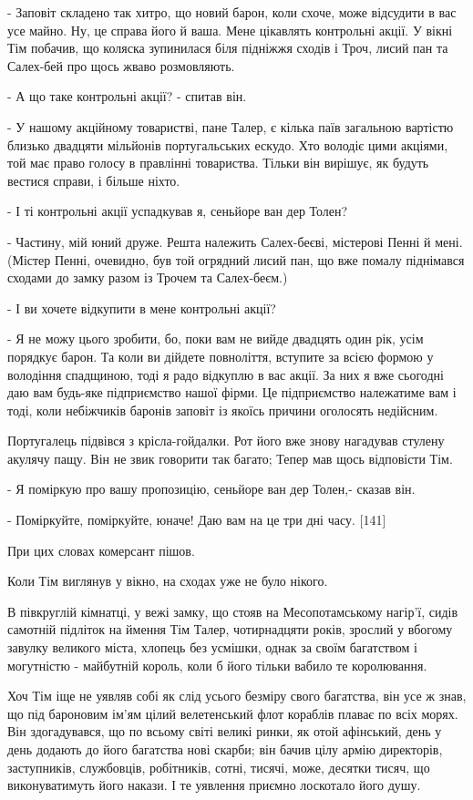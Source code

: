 - Заповіт складено так хитро, що новий барон, коли схоче, може відсудити в вас усе майно. Ну, це справа його й ваша. Мене цікавлять контрольні акції. У вікні Тім побачив, що коляска зупинилася біля підніжжя сходів і Троч, лисий пан та Салех-бей про щось жваво розмовляють.

- А що таке контрольні акції? - спитав він.

- У нашому акційному товаристві, пане Талер, є кілька паїв загальною вартістю близько двадцяти мільйонів португальських ескудо. Хто володіє цими акціями, той має право голосу в правлінні товариства. Тільки він вирішує, як будуть вестися справи, і більше ніхто.

- І ті контрольні акції успадкував я, сеньйоре ван дер Толен?

- Частину, мій юний друже. Решта належить Салех-беєві, містерові Пенні й мені. (Містер Пенні, очевидно, був той огрядний лисий пан, що вже помалу піднімався сходами до замку разом із Трочем та Салех-беєм.)

- І ви хочете відкупити в мене контрольні акції?

- Я не можу цього зробити, бо, поки вам не вийде двадцять один рік, усім порядкує барон. Та коли ви дійдете повноліття, вступите за всією формою у володіння спадщиною, тоді я радо відкуплю в вас акції. За них я вже сьогодні даю вам будь-яке підприємство нашої фірми. Це підприємство належатиме вам і тоді, коли небіжчиків баронів заповіт із якоїсь причини оголосять недійсним.

Португалець підвівся з крісла-гойдалки. Рот його вже знову нагадував стулену акулячу пащу. Він не звик говорити так багато; Тепер мав щось відповісти Тім.

- Я поміркую про вашу пропозицію, сеньйоре ван дер Толен,- сказав він.

- Поміркуйте, поміркуйте, юначе! Даю вам на це три дні часу. [141]

При цих словах комерсант пішов.

Коли Тім виглянув у вікно, на сходах уже не було нікого.

В півкруглій кімнатці, у вежі замку, що стояв на Месопотамському нагір'ї, сидів самотній підліток на ймення Тім Талер, чотирнадцяти років, зрослий у вбогому завулку великого міста, хлопець без усмішки, однак за своїм багатством і могутністю - майбутній король, коли б його тільки вабило те королювання.

Хоч Тім іще не уявляв собі як слід усього безміру свого багатства, він усе ж знав, що під бароновим ім'ям цілий велетенський флот кораблів плаває по всіх морях. Він здогадувався, що по всьому світі великі ринки, як отой афінський, день у день додають до його багатства нові скарби; він бачив цілу армію директорів, заступників, службовців, робітників, сотні, тисячі, може, десятки тисяч, що виконуватимуть його накази. І те уявлення приємно лоскотало його душу.

